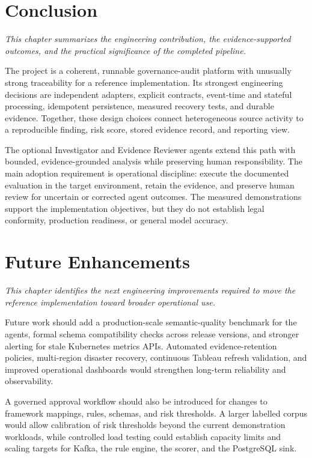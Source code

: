 \documentclass[12pt,oneside]{report}
\begin{document}
\chapter{Conclusion}
\noindent\textit{This chapter summarizes the engineering contribution, the evidence-supported outcomes, and the practical significance of the completed pipeline.}\par
The project is a coherent, runnable governance-audit platform with unusually strong traceability for a reference implementation. Its strongest engineering decisions are independent adapters, explicit contracts, event-time and stateful processing, idempotent persistence, measured recovery tests, and durable evidence. Together, these design choices connect heterogeneous source activity to a reproducible finding, risk score, stored evidence record, and reporting view.

The optional Investigator and Evidence Reviewer agents extend this path with bounded, evidence-grounded analysis while preserving human responsibility. The main adoption requirement is operational discipline: execute the documented evaluation in the target environment, retain the evidence, and preserve human review for uncertain or corrected agent outcomes. The measured demonstrations support the implementation objectives, but they do not establish legal conformity, production readiness, or general model accuracy.

\chapter{Future Enhancements}
\noindent\textit{This chapter identifies the next engineering improvements required to move the reference implementation toward broader operational use.}\par
Future work should add a production-scale semantic-quality benchmark for the agents, formal schema compatibility checks across release versions, and stronger alerting for stale Kubernetes metrics APIs. Automated evidence-retention policies, multi-region disaster recovery, continuous Tableau refresh validation, and improved operational dashboards would strengthen long-term reliability and observability.

A governed approval workflow should also be introduced for changes to framework mappings, rules, schemas, and risk thresholds. A larger labelled corpus would allow calibration of risk thresholds beyond the current demonstration workloads, while controlled load testing could establish capacity limits and scaling targets for Kafka, the rule engine, the scorer, and the PostgreSQL sink.
\end{document}

